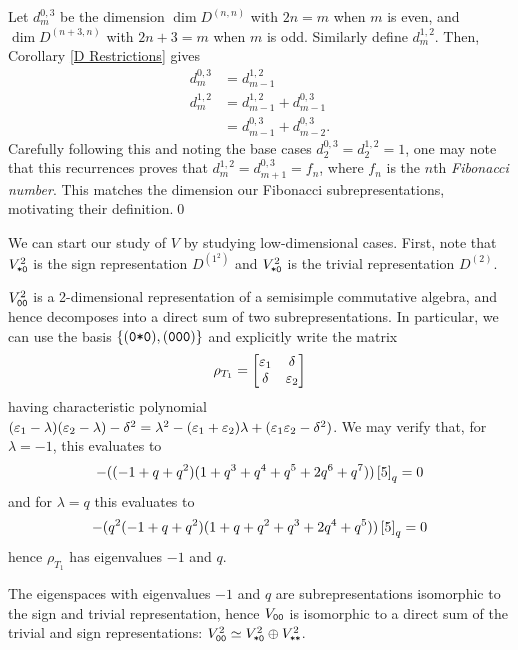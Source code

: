 \documentclass{amsart}
\begin{document}
\begin{remark}
  Let $d_{m}^{0,3}$ be the dimension $\dim D^{(n,n)}$ with $2n = m$ when $m$ is even, and $\dim D^{(n+3,n)}$ with $2n + 3 = m$ when $m$ is odd.
  Similarly define $d_m^{1,2}$.
  Then, Corollary \ref{D Restrictions} gives
  \begin{align*}
    d_m^{0,3} &= d_{m-1}^{1,2}\\
    d_m^{1,2} &= d_{m-1}^{1,2} + d_{m-1}^{0,3}\\
    &= d_{m-1}^{0,3} + d_{m-2}^{0,3}.
  \end{align*}
  Carefully following this and noting the base cases $d_2^{0,3} = d_2^{1,2} = 1$, one may note that this recurrences proves that $d_m^{1,2} = d_{m+1}^{0,3} = f_n$, where $f_n$ is the $n$th \emph{Fibonacci number}.
  This matches the dimension our Fibonacci subrepresentations, motivating their definition.\qed
\end{remark}

We can start our study of $V$ by studying low-dimensional cases.
First, note that $V_{\texttt{*}\texttt{0}}^2$ is the sign representation $D^{(1^2)}$ and $V_{\texttt{*}\texttt{0}}^2$ is the trivial representation $D^{(2)}$.

$V_{\texttt{0}\texttt{0}}^2$ is a 2-dimensional representation of a semisimple commutative algebra, and hence decomposes into a direct sum of two subrepresentations.
In particular, we can use the basis $\left\{ (\texttt{0}\texttt{*}\texttt{0}),(\texttt{0}\texttt{0}\texttt{0}) \right\}$ and explicitly write the matrix
\[
  \rho_{T_1} = \begin{bmatrix}
    \varepsilon_1 & \delta\\
    \delta & \varepsilon_2
  \end{bmatrix}
\]
having characteristic polynomial $(\varepsilon_1 - \lambda)(\varepsilon_2 - \lambda) - \delta^2 = \lambda^2 - (\varepsilon_1 + \varepsilon_2)\lambda +(\varepsilon_1\varepsilon_2 - \delta^2)$.
We may verify that, for $\lambda = -1$, this evaluates to
\[
  -((-1 + q + q^2) (1 + q^3 + q^4 + q^5 + 2 q^6 + q^7))\left[ 5 \right]_q = 0
\]
and for $\lambda = q$ this evaluates to 
\[
-(q^2 (-1 + q + q^2) (1 + q + q^2 + q^3 + 2 q^4 + q^5)) \left[ 5 \right]_q = 0
\]
hence $\rho_{T_1}$ has eigenvalues $-1$ and $q$.

The eigenspaces with eigenvalues $-1$ and $q$ are subrepresentations isomorphic to the sign and trivial representation, hence $V_{\texttt{0}\texttt{0}}$ is isomorphic to a direct sum of the trivial and sign representations: $V^2_{\texttt{0}\texttt{0}} \simeq V^2_{\texttt{*}\texttt{0}} \oplus V^2_{\texttt{*}\texttt{*}}$. 
\end{document}
